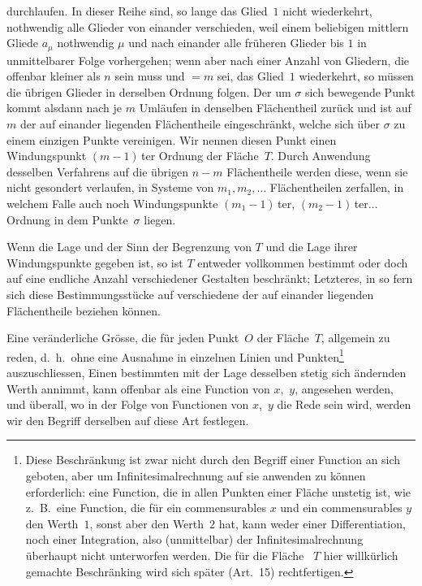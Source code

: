 \documentclass[a4paper,12pt]{article}
\begin{document}
durchlaufen.  In dieser Reihe sind, so lange das Glied~$1$ nicht
wiederkehrt, nothwendig alle Glieder von einander verschieden,
weil einem beliebigen mittlern Gliede $a_\mu$ nothwendig $\mu$
und nach einander alle fr\"{u}heren Glieder bis $1$ in
unmittelbarer Folge vorhergehen; wenn aber nach einer Anzahl von
Gliedern, die offenbar kleiner als $n$ sein muss und $= m$ sei,
das Glied~$1$ wiederkehrt, so m\"{u}ssen die \"{u}brigen Glieder
in derselben Ordnung folgen.  Der um $\sigma$ sich bewegende
Punkt kommt alsdann nach je $m$ Uml\"{a}ufen in denselben
Fl\"{a}chentheil zur\"{u}ck und ist auf $m$ der auf einander
liegenden Fl\"{a}chentheile eingeschr\"{a}nkt, welche sich
\"{u}ber $\sigma$ zu einem einzigen Punkte vereinigen.  Wir
nennen diesen Punkt einen Windungspunkt $(m-1) \,$\-ter Ordnung der
Fl\"{a}che~$T$.  Durch Anwendung desselben Verfahrens auf die
\"{u}brigen $n - m$ Fl\"{a}chentheile werden diese, wenn sie
nicht gesondert verlaufen, in Systeme von $m_1, m_2,\ldots$
Fl\"{a}chentheilen zerfallen, in welchem Falle auch noch
Windungspunkte $(m_1 - 1) \,$\-ter, $(m_2 - 1) \,$\-ter$\ldots$ Ordnung in
dem Punkte~$\sigma$ liegen.

Wenn die Lage und der Sinn der Begrenzung von $T$ und die Lage
ihrer Windungspunkte gegeben ist, so ist $T$ entweder vollkommen
bestimmt oder doch auf eine endliche Anzahl verschiedener
Gestalten beschr\"{a}nkt; Letzteres, in so fern sich diese
Bestimmungsst\"{u}cke auf verschiedene der auf einander liegenden
Fl\"{a}chentheile beziehen k\"{o}nnen.

Eine ver\"{a}nderliche Gr\"{o}sse, die f\"{u}r jeden Punkt~$O$
der Fl\"{a}che~$T$, allgemein zu reden, d.~h.\ ohne eine Ausnahme
in einzelnen Linien und Punkten\footnote{Diese Beschr\"{a}nkung
ist zwar nicht durch den Begriff einer Function an sich geboten,
aber um Infinitesimalrechnung auf sie anwenden zu k\"{o}nnen
erforderlich: eine Function, die in allen Punkten einer
Fl\"{a}che unstetig ist, wie z.~B.\ eine Function, die f\"{u}r
ein commensurables $x$ und ein commensurables $y$ den Werth~$1$,
sonst aber den Werth~$2$ hat, kann weder einer Differentiation,
noch einer Integration, also (unmittelbar) der
Infinitesimalrechnung \"{u}berhaupt nicht unterworfen werden.
Die f\"{u}r die Fl\"{a}che ~$T$ hier willk\"{u}rlich gemachte
Beschr\"{a}nking wird sich sp\"{a}ter (Art.~15) rechtfertigen.}
auszuschliessen, Einen bestimmten mit der Lage desselben stetig
sich \"{a}ndernden Werth annimmt, kann offenbar als eine Function
von $x$,~$y$, angesehen werden, und \"{u}berall, wo in der Folge
von Functionen von $x$,~$y$ die Rede sein wird, werden wir den
Begriff derselben auf diese Art festlegen.
\end{document}
